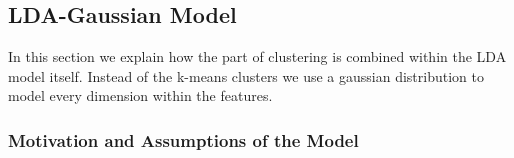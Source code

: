\documentclass[11pt,a4paper]{article}
\begin{document}
% 
%  
% 
% 

\subsection{LDA-Gaussian Model}
In this section we explain how the part of clustering is combined within the LDA model itself. Instead of the k-means clusters we use a gaussian distribution to model every dimension within the features.


\subsubsection{Motivation and Assumptions of the Model}
  
\end{document}

